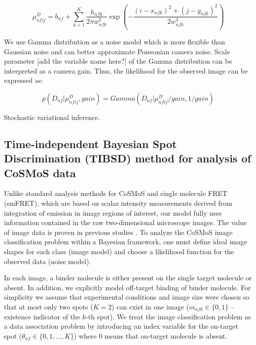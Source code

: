 \textbf{\begin{equation*}
    \mu^{D}_{nfij} = b_{nf} + \sum_{k=1}^{K} \dfrac{h_{nfk}}{2 \pi w^2_{nfk}} \exp{\left ( -\dfrac{(i-x_{nfk})^2 + (j-y_{nfk})^2}{2w^2_{nfk}} \right)}
\end{equation*}}

We use Gamma distribution as a noise model which is more flexible than Gaussian noise and can better approximate Poissonian camera noise. Scale parameter [add the variable name here?] of the Gamma distribution can be interpreted as a camera gain. Thus, the likelihood for the observed image can be expressed as:
 
 \begin{equation*}
     p(D_{nf}|\mu^D_{nfij},gain) = Gamma(D_{nf}|\mu^D_{nfij}/gain,1/gain)
 \end{equation*}

Stochastic variational inference.

\subsection{Time-independent Bayesian Spot Discrimination (TIBSD) method for analysis of CoSMoS data}

Unlike standard analysis methods for CoSMoS and single molecule FRET (smFRET), which are based on scalar intensity measurements derived from integration of emission in image regions of interest, our model fully uses information contained in the raw two-dimensional microscope images. The value of image data is proven in previous studies \citep{Friedman2015-nx,Smith2019-yb}. To analyze the CoSMoS image classification problem within a Bayesian framework, one must define ideal image shapes for each class (image model) and choose a likelihood function for the observed data (noise model).

In each image, a binder molecule is either present on the single target molecule or absent. In addition, we explicitly model off-target binding of binder molecule. For simplicity  we assume that experimental conditions and image size were chosen so that at most only two spots ($K=2$) can exist in one image ($m_{nfk} \in \{ 0,1 \}$ -- existence indicator of the $k$-th spot). We treat the image classification problem as a data association problem by introducing an index variable for the on-target spot ($\theta_{nf} \in \{ 0,1,\dots,K \}$) where 0 means that on-target molecule is absent.





